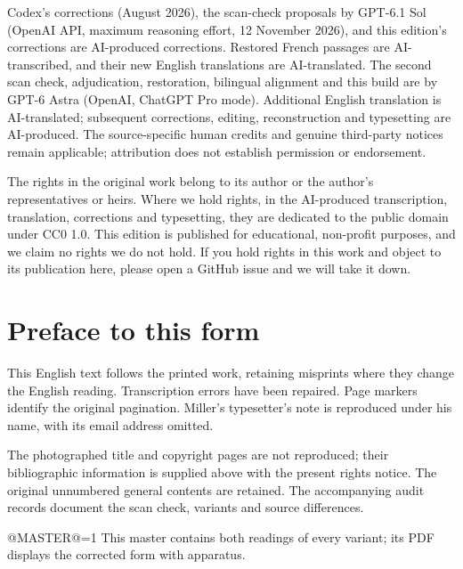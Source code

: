 \documentclass[oneside]{book}
\makeatletter
\theoremstyle{sga-source}
\theoremstyle{sga-source-dash}
\theoremstyle{sga-source-dotdash}
\theoremstyle{sga-source-number-note-dash}
\theoremstyle{sga-source-note-number-dotdash}
\theoremstyle{sga-source-example-dotdash}
\theoremstyle{sga-source-inline-number}
\theoremstyle{sga-source-bare-number}
\theoremstyle{sga-source}
\providecommand\EditionIsMaster{@MASTER@}
\makeatother
\begin{document}
\medskip
Codex’s corrections (August 2026), the scan-check proposals by GPT-6.1 Sol
(OpenAI API, maximum reasoning effort, 12 November 2026), and this edition’s
corrections are AI-produced corrections. Restored French passages are
AI-transcribed, and their new English translations are AI-translated.
The second scan check, adjudication, restoration, bilingual alignment and
this build are by GPT-6 Astra (OpenAI, ChatGPT Pro mode).
Additional English translation is AI-translated; subsequent corrections,
editing, reconstruction and typesetting are AI-produced. The
source-specific human credits and genuine third-party notices remain
applicable; attribution does not establish permission or endorsement.

\medskip
The rights in the original work belong to its author or the author's representatives or heirs.
Where we hold rights, in the AI-produced transcription, translation, corrections and typesetting, they are
dedicated to the public domain under CC0 1.0. This edition is published for educational, non-profit purposes,
and we claim no rights we do not hold. If you hold rights in this work and object to its publication here,
please open a GitHub issue and we will take it down.

\chapter*{Preface to this form}
This English text follows the printed work, retaining misprints
where they change the English reading. Transcription errors have been
repaired. Page markers identify the original pagination. Miller’s
typesetter’s note is reproduced under his name, with its email address
omitted.

The photographed title and copyright pages are not reproduced; their
bibliographic information is supplied above with the present rights
notice. The original unnumbered general contents are retained. The
accompanying audit records document the scan check, variants and source
differences.

\ifnum\EditionIsMaster=1\relax
This master contains both readings of every variant; its PDF displays the corrected form with apparatus.
\fi

\clearpage

\or
\end{document}
